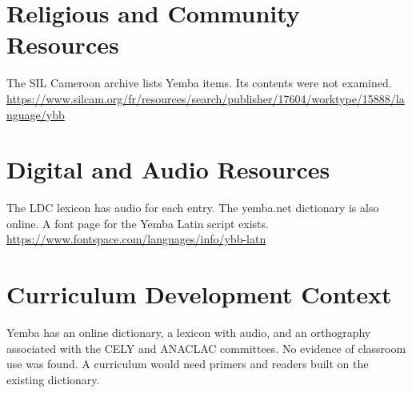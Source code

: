 \documentclass[12pt]{article}
\begin{document}
\section{Religious and Community Resources}
The SIL Cameroon archive lists Yemba items. Its contents were not examined. \url{https://www.silcam.org/fr/resources/search/publisher/17604/worktype/15888/language/ybb}

\section{Digital and Audio Resources}
The LDC lexicon has audio for each entry. The yemba.net dictionary is also online. A font page for the Yemba Latin script exists. \url{https://www.fontspace.com/languages/info/ybb-latn}

\section{Curriculum Development Context}
Yemba has an online dictionary, a lexicon with audio, and an orthography associated with the CELY and ANACLAC committees. No evidence of classroom use was found. A curriculum would need primers and readers built on the existing dictionary.
\end{document}
